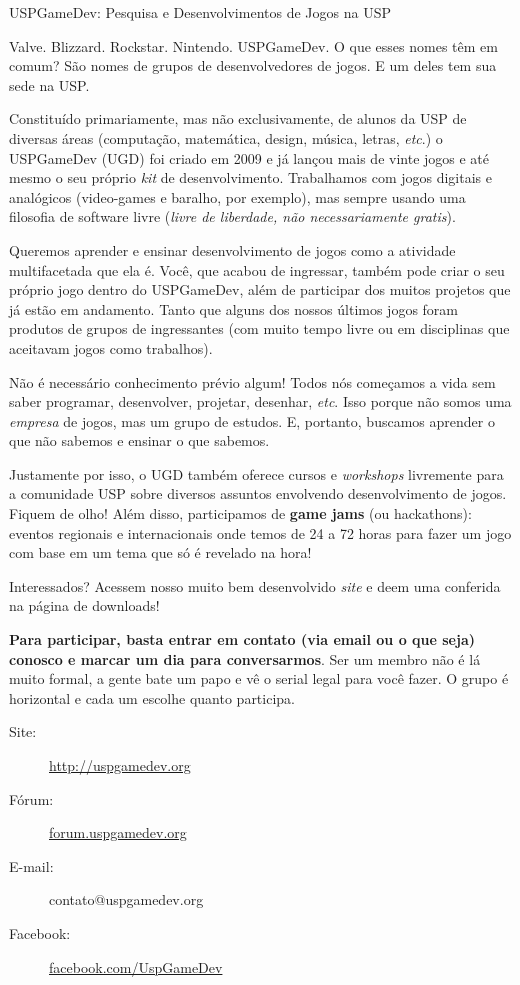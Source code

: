 \begin{subsecao}{USPGameDev: Pesquisa e Desenvolvimentos de Jogos na USP}


Valve. Blizzard. Rockstar. Nintendo. USPGameDev. O que esses nomes têm em comum? São nomes de grupos
de desenvolvedores de jogos. E um deles tem sua sede na USP.

Constituído primariamente, mas não exclusivamente, de alunos da USP de diversas áreas (computação,
matemática, design, música, letras, \textit{etc}.) o USPGameDev (UGD) foi criado em 2009 e já lançou
mais de vinte jogos e até mesmo o seu próprio \textit{kit} de desenvolvimento. Trabalhamos com jogos
digitais e analógicos (video-games e baralho, por exemplo), mas sempre usando uma filosofia de 
software livre (\textit{livre de liberdade, não necessariamente gratis}).

Queremos aprender e ensinar desenvolvimento de jogos como a atividade multifacetada que ela é. 
Você, que acabou de ingressar, também pode criar o seu próprio jogo dentro do USPGameDev, além de 
participar dos muitos projetos que já estão em andamento. Tanto que alguns dos nossos últimos jogos
foram produtos de grupos de ingressantes (com muito tempo livre ou em disciplinas que aceitavam 
jogos como trabalhos). 

Não é necessário conhecimento prévio algum! Todos nós começamos a vida sem saber programar, 
desenvolver, projetar, desenhar, \textit{etc}. Isso porque não somos uma \textit{empresa} de jogos, 
mas um grupo de estudos. E, portanto, buscamos aprender o que não sabemos e ensinar o que sabemos.

Justamente por isso, o UGD também oferece cursos e \textit{workshops} livremente para a comunidade 
USP sobre diversos assuntos envolvendo desenvolvimento de jogos. Fiquem de olho! Além disso, 
participamos de \textbf{game jams} (ou hackathons): eventos regionais e internacionais onde temos de 
24 a 72 horas para fazer um jogo com base em um tema que só é revelado na hora!

Interessados? Acessem nosso muito bem desenvolvido \textit{site} e deem uma conferida na página de 
downloads! 

\textbf{Para participar, basta entrar em contato (via email ou o que seja) conosco e marcar um dia 
para conversarmos}. Ser um membro não é lá muito formal, a gente bate um papo e vê o serial legal 
para você fazer. O grupo é horizontal e cada um escolhe quanto participa.

\begin{description}
  \item[Site:] \url{http://uspgamedev.org}
  \item[Fórum:] \url{forum.uspgamedev.org}
  \item[E-mail:] contato@uspgamedev.org
  \item[Facebook:] \url{facebook.com/UspGameDev}
\end{description}

\end{subsecao}
